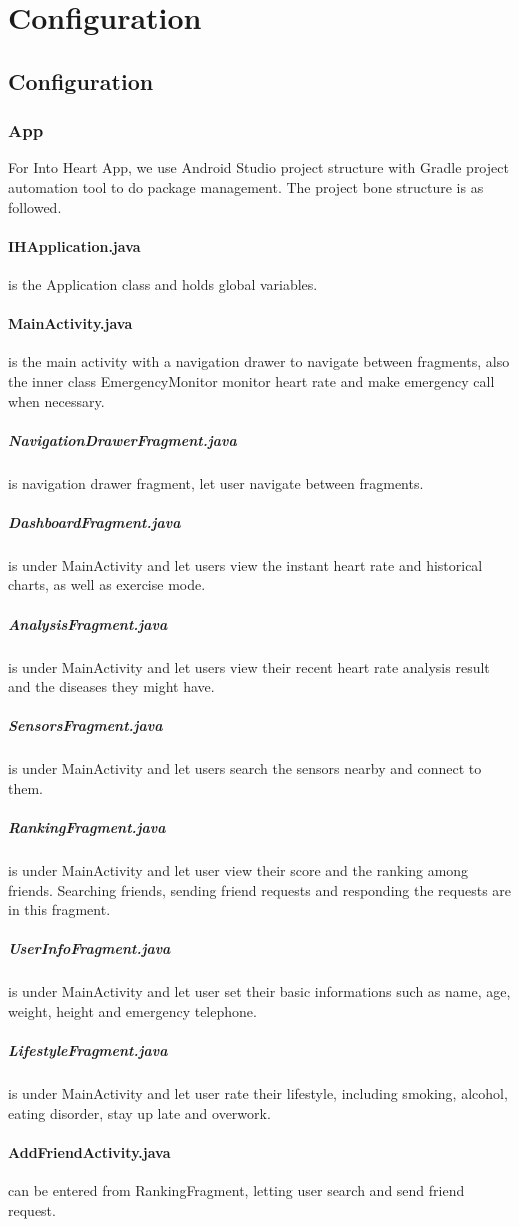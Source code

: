 \documentclass[10pt,a4paper,final]{scrartcl}
\begin{document}
\section{Configuration}
\subsection{Configuration}
\subsubsection{App}
For Into Heart App, we use Android Studio project structure with Gradle project automation tool to do package management. The project bone structure is as followed.

\paragraph{IHApplication.java} is the Application class and holds global variables.
\paragraph{MainActivity.java} is the main activity with a navigation drawer to navigate between fragments, also the inner class EmergencyMonitor monitor heart rate and make emergency call when necessary.
\subparagraph{NavigationDrawerFragment.java} is navigation drawer fragment, let user navigate between fragments.
\subparagraph{DashboardFragment.java} is under MainActivity and let users view the instant heart rate and historical charts, as well as exercise mode.
\subparagraph{AnalysisFragment.java} is under MainActivity and let users view their recent heart rate analysis result  and the diseases they might have.
\subparagraph{SensorsFragment.java} is under MainActivity and let users search the sensors nearby and connect to them.
\subparagraph{RankingFragment.java} is under MainActivity and let user view their score and the ranking among friends. Searching friends, sending friend requests and responding the requests are in this fragment.
\subparagraph{UserInfoFragment.java} is under MainActivity and let user set their basic informations such as name, age, weight, height and emergency telephone.
\subparagraph{LifestyleFragment.java} is under MainActivity and let user rate their lifestyle, including smoking, alcohol, eating disorder, stay up late and overwork.
\paragraph{AddFriendActivity.java} can be entered from RankingFragment, letting user search and send friend request.
\end{document}
